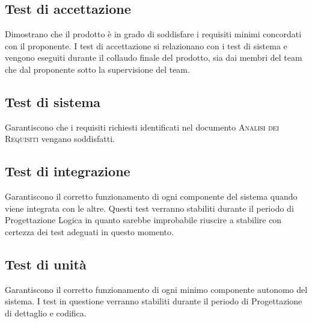 \documentclass[../piano-di-qualifica.tex]{subfiles}
\begin{document}
\subsection{Test di accettazione}
\label{sub:test_di_accettazione}
Dimostrano che il prodotto è in grado di soddisfare i requisiti minimi concordati con il proponente.
I test di accettazione si relazionano con i test di sistema e vengono eseguiti durante il collaudo finale del prodotto, sia dai membri del team che dal proponente sotto la supervisione del team.

\subsection{Test di sistema}
\label{sub:test_di_sistema}
Garantiscono che i requisiti richiesti identificati nel documento \textsc{Analisi dei Requisiti} vengano soddisfatti. 

\subsection{Test di integrazione}
\label{sub:test_di_integrazione}
Garantiscono il corretto funzionamento di ogni componente del sistema quando viene integrata con le altre.
Questi test verranno stabiliti durante il periodo di Progettazione Logica in quanto sarebbe improbabile riuscire a stabilire con certezza dei test adeguati in questo momento.

\subsection{Test di unità}
\label{sub:test_di_unita}
Garantiscono il corretto funzionamento di ogni minimo componente autonomo del sistema.
I test in questione verranno stabiliti durante il periodo di Progettazione di dettaglio e codifica.
\end{document}
